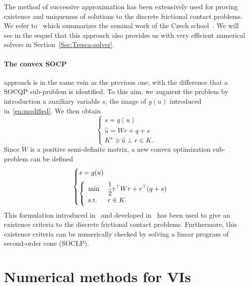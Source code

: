 {The method of successive approximation has been extensively used for proving existence and uniqueness of solutions to the discrete frictional contact problems. We refer to~\cite{Haslinger.ea1996} which summarizes the seminal work of the Czech school~\cite{Necas.ea1980,Haslinger1983,Haslinger1984}. We will see in the sequel that this approach also provides us with very efficient numerical solvers in Section~\ref{Sec:Tresca-solver}.

\paragraph{The convex SOCP} approach is in the same vein as the previous one, with the difference that a SOCQP sub-problem is identified.
To this aim, we augment the problem by introduction a auxiliary variable $s$, the image of $g(u)$ introduced in~\eqref{eq:modified}.
We then obtain
\begin{equation}\label{eq:ACLM-2}
  \begin{cases}
    s = g(u) \\[2mm]
    \hat u = W r + q + s  \\[2mm]
    K^\star \ni {\hat u} \perp r \in K.
  \end{cases}
\end{equation} 
Since $W$ is a positive semi-definite matrix, a new convex optimization sub-problem can be defined 
\begin{equation}\label{eq:ACLM-3}
  \begin{cases}
    s = g(u) \\[2mm]
    \left\{
      \begin{array}{ll}
        \min\,&\Frac 1 2 r^\top W r + r^\top (q + s)  \\
        \text{s.t. } & r \in K.
      \end{array}
    \right.
  \end{cases}
\end{equation} 
This formulation introduced in~\cite{Cadoux2009} and developed in~\cite{Acary.Cadoux2013,Acary.ea_ZAMM2011} has been used to give an existence criteria to the discrete frictional contact problems. Furthermore, this existence criteria can be numerically checked by solving a linear program of second-order cone (SOCLP).

\clearpage
\section{Numerical methods for VIs}
\label{sec:numericalmethods,vi}


}
